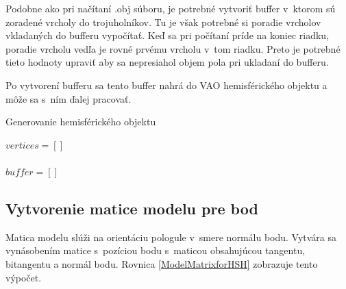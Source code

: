 Podobne ako pri načítaní .obj súboru, je potrebné vytvoriť buffer v~ktorom sú zoradené vrcholy do trojuholníkov. Tu je však potrebné si poradie vrcholov vkladaných do bufferu vypočítať. Keď sa pri počítaní príde na koniec riadku, poradie vrcholu vedľa je rovné prvému vrcholu v~tom riadku. Preto je potrebné tieto hodnoty upraviť aby sa nepresiahol objem pola pri ukladaní do bufferu.

Po vytvorení bufferu sa tento buffer nahrá do VAO hemisférického objektu a môže sa s~ním ďalej pracovať.

\begin{algorithm}[t!]
\caption{Generovanie hemisférického objektu}\label{HemGenPseu}
$vertices = []$ \\
\texttt{\\}
$buffer = []$\\
\end{algorithm}

\subsection*{Vytvorenie matice modelu pre bod}
Matica modelu slúži na orientáciu pologule v~smere normálu bodu. Vytvára sa vynásobením matice s~pozíciou bodu s~maticou obsahujúcou tangentu, bitangentu a normál bodu. Rovnica \ref{ModelMatrixforHSH} zobrazuje tento výpočet.

